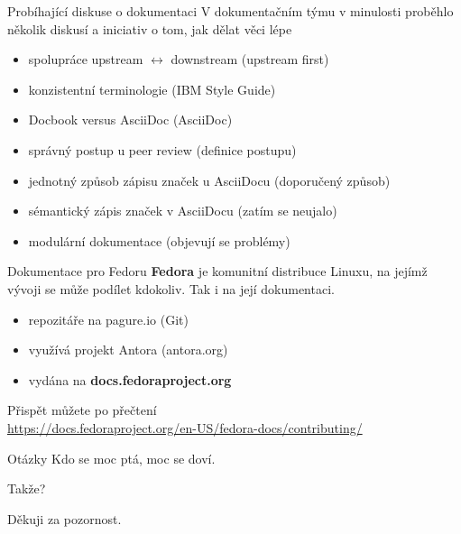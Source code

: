 \documentclass[12pt]{beamer}
\begin{document}
	\begin{frame}{Probíhající diskuse o dokumentaci}
	V dokumentačním týmu v minulosti proběhlo několik diskusí a iniciativ o tom, jak dělat věci lépe
	
	\begin{itemize}
		\item spolupráce upstream $\longleftrightarrow$ downstream (upstream first)
		\item konzistentní terminologie (IBM Style Guide)
		\item Docbook versus AsciiDoc (AsciiDoc)
		\item správný postup u peer review (definice postupu)
		\item jednotný způsob zápisu značek u AsciiDocu (doporučený způsob)
		\item sémantický zápis značek v AsciiDocu (zatím se neujalo)
		\item modulární dokumentace (objevují se problémy)
	\end{itemize}
	\end{frame}

	\begin{frame}{Dokumentace pro Fedoru}
\textbf{Fedora} je komunitní distribuce Linuxu, na jejímž vývoji se může podílet kdokoliv. Tak i na její dokumentaci.

	\begin{itemize}
		\item repozitáře na pagure.io (Git)
		\item využívá projekt Antora (antora.org)
		\item vydána na \textbf{docs.fedoraproject.org}
	\end{itemize}

	Přispět můžete po přečtení \\
	\url{https://docs.fedoraproject.org/en-US/fedora-docs/contributing/}

	\end{frame}


	\begin{frame}{Otázky}
		Kdo se moc ptá, moc se doví.
		
		\vspace{10pt}
		
		Takže?
	\end{frame}

	\begin{frame}
	Děkuji za pozornost.
	\end{frame}
\end{document}
